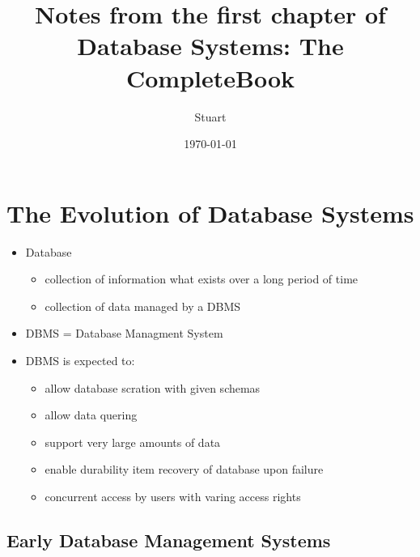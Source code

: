 \documentclass[12pt]{report}
\author{Stuart}
\date{\today}
\title{Notes from the first chapter of Database Systems: The CompleteBook}
\begin{document}
\maketitle

\section{The Evolution of Database Systems}
\begin{itemize}
	\item Database
		\begin{itemize}
			\item collection of information what exists over a long period of time
			\item collection of data managed by a DBMS
		\end{itemize}
	\item DBMS = Database Managment System
	\item DBMS is expected to:
		\begin{itemize}
                    \item allow database scration with given schemas
                    \item allow data quering
                    \item support very large amounts of data
		    \item enable durability item recovery of database upon failure
		    \item concurrent access by users with varing access rights
    		\end{itemize}
\end{itemize}

\subsection{Early Database Management Systems}
\end{document}
